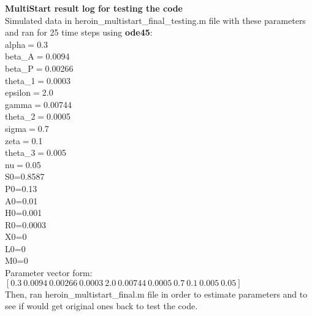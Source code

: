 \documentclass[12pt]{article}
\begin{document}
\noindent \textbf{MultiStart result log for testing the code} \\
Simulated data in heroin\_multistart\_final\_testing.m file with these parameters and ran for 25 time steps using \textbf{ode45}: \\
alpha$=$0.3 \\
beta\_{A}$=$0.0094 \\
beta\_{P}$=$0.00266 \\
theta\_{1}$=$0.0003 \\
epsilon$=$2.0 \\
gamma$=$0.00744 \\
theta\_{2}$=$0.0005 \\
sigma$=$0.7 \\
zeta$=$0.1 \\
theta\_{3}$=$0.005 \\
nu$=$0.05 \\



\noindent S0=0.8587 \\
P0=0.13 \\
A0=0.01 \\
H0=0.001 \\
R0=0.0003 \\
X0=0 \\
L0=0 \\
M0=0 \\

Parameter vector form: $[0.3 \ 0.0094 \ 0.00266 \ 0.0003 \ 2.0 \ 0.00744 \ 0.0005 \ 0.7 \ 0.1 \ 0.005 \ 0.05]$ \\

\noindent Then, ran heroin\_multistart\_final.m file in order to estimate parameters and to see if would get original ones back to test the code.
\end{document}
